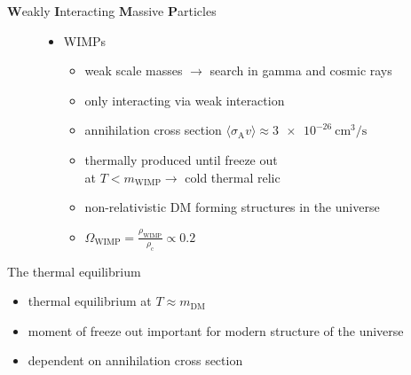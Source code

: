 \documentclass[11pt,a4paper,titlepage]{beamer}
\begin{document}
\begin{frame}{\textbf{W}eakly \textbf{I}nteracting \textbf{M}assive \textbf{P}articles}
\begin{figure}
\begin{minipage}{0.65 \textwidth}
\begin{itemize}
\item WIMPs
\begin{itemize}
\item weak scale masses $\rightarrow$ search in gamma and cosmic rays\medskip
\item only interacting via weak interaction\medskip
\item annihilation cross section $\langle \sigma_\text{A}v\rangle\approx \SI{3e-26}{\centi\meter^3\per\second}$\medskip
\item thermally produced until \glqq freeze out\grqq\\
at $T<m_\text{WIMP}\rightarrow$ cold thermal relic\medskip
\item non-relativistic DM forming structures in the universe\medskip
\item $\Omega_\text{WIMP} = \frac{\rho_\text{WIMP}}{\rho_\text{c}}\propto 0.2$
\end{itemize}
\end{itemize}
\end{minipage}
\begin{minipage}{0.34\textwidth}
\end{minipage}
\end{figure}
\end{frame}
\begin{frame}{The thermal equilibrium}
\begin{minipage}{\textwidth}
\centering
\end{minipage}
\begin{minipage}{\textwidth}
\begin{itemize}
\item thermal equilibrium at $T\approx m_\text{DM}$\medskip
\item moment of freeze out important for modern structure of the universe
\item dependent on annihilation cross section
\end{itemize}
\end{minipage}
\end{frame}
\end{document}
